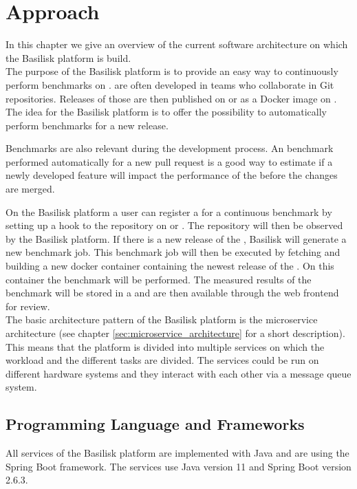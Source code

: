 \chapter{Approach}
\label{ch:approach}

In this chapter we give an overview of the current software architecture on which the Basilisk platform is build.
\\

The purpose of the Basilisk platform is to provide an easy way to continuously perform benchmarks on \tsp{}.
\tsp{} are often developed in teams who collaborate in Git repositories.
Releases of those \tsp{} are then published on \gh{} or as a Docker image on \dockh{}.
The idea for the Basilisk platform is to offer the possibility to automatically perform benchmarks for a new \ts{} release.

Benchmarks are also relevant during the development process.
An benchmark performed automatically for \eg{} a new pull request is a good way to estimate if a newly developed feature will impact the performance of the \ts{} before the changes are merged.

On the Basilisk platform a user can register a \ts{} for a continuous benchmark by setting up a hook to the repository on \gh{} or \dockh{}.
The repository will then be observed by the Basilisk platform.
If there is a new release of the \ts{}, Basilisk will generate a new benchmark job.
This benchmark job will then be executed by fetching and building a new docker container containing the newest release of the \ts{}.
On this container the benchmark will be performed.
The measured results of the benchmark will be stored in a \ts{} and are then available through the web frontend for review.
\\

The basic architecture pattern of the Basilisk platform is the microservice architecture (see chapter \ref{sec:microservice_architecture} for a short description). 
This means that the platform is divided into multiple services on which the workload and the different tasks are divided.
The services could be run on different hardware systems and they interact with each other via a message queue system.
\\

\section{Programming Language and Frameworks}
\label{sec:prog_lang_and_framework}
All services of the Basilisk platform are implemented with Java and are using the Spring Boot framework.
The services use Java version 11 and Spring Boot version 2.6.3.

